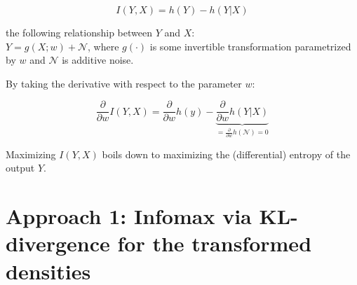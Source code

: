 \begin{frame}


\begin{equation}
I(Y,X) = h(Y) - h(Y|X)
\end{equation}

 the following relationship between $Y$ and $X$:\\
$Y = g(X;w) + \mathcal{N}$, where $g(\cdot)$ is some invertible transformation parametrized by $w$ and $\mathcal{N}$ is additive noise.

By taking the derivative with respect to the parameter $w$:

\begin{equation}
\frac{\partial}{\partial w} I(Y,X) = \frac{\partial}{\partial w}h(y) - 
\underbrace{\frac{\partial}{\partial w} h(Y|X)}_{= \frac{\partial}{\partial w} h(\mathcal{N}) = 0}
\end{equation}

Maximizing $I(Y,X)$ boils down to maximizing the (differential) entropy of the output $Y$. 


\end{frame}

\clearpage

\section{Approach 1: Infomax via KL-divergence for the transformed densities}

